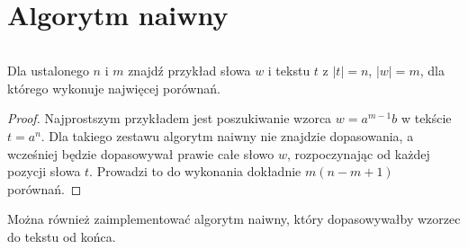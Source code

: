\section{Algorytm naiwny}

\begin{code}
\inputminted{python}{code/exact-string-matching/naive-forward.py}
\label{alg:exact-string-matching-naive-forward}
\end{code}

\begin{problem}{}{}
  Dla ustalonego $n$ i $m$ znajdź przykład słowa $w$ i tekstu $t$ z $|t| = n$, $|w| = m$, dla którego  wykonuje najwięcej porównań.
\end{problem}

\begin{proof}
Najprostszym przykładem jest poszukiwanie wzorca $w=a^{m-1}b$ w tekście $t=a^n$. Dla takiego zestawu algorytm naiwny nie znajdzie dopasowania, a wcześniej będzie dopasowywał prawie całe słowo $w$, rozpoczynając od każdej pozycji słowa $t$. Prowadzi to do wykonania dokładnie $m (n - m + 1)$ porównań.
\end{proof}

Można również zaimplementować algorytm naiwny, który dopasowywałby wzorzec do tekstu od końca.

\begin{code}
\inputminted{python}{code/exact-string-matching/naive-backward.py}
\label{alg:exact-string-matching-naive-backward}
\end{code}
